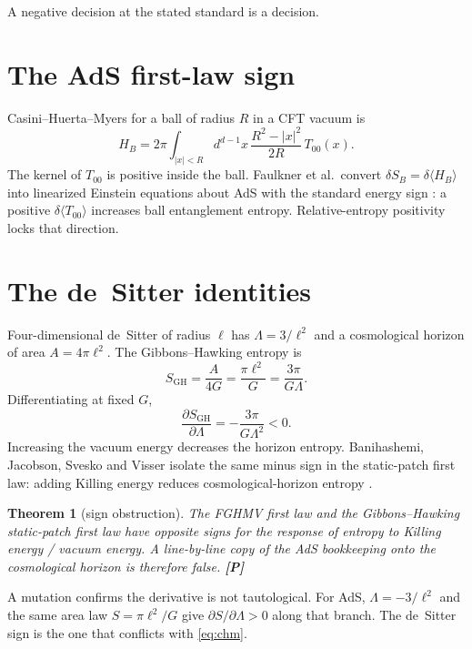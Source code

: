 \documentclass[11pt]{article}
\newtheorem{theorem}{Theorem}[section]
\theoremstyle{definition}
\newcommand{\pP}{\textbf{[P]}}
\begin{document}
A negative decision at the stated standard is a decision.

\section{The AdS first-law sign}

Casini--Huerta--Myers for a ball of radius $R$ in a CFT vacuum is
\cite{CHM2011}
\begin{equation}
H_B
=
2\pi\int_{\lvert x\rvert<R}\!d^{d-1}x\,
\frac{R^2-\lvert x\rvert^2}{2R}\,T_{00}(x).
\label{eq:chm}
\end{equation}
The kernel of $T_{00}$ is positive inside the ball. Faulkner et
al.\ convert $\delta S_B=\delta\langle H_B\rangle$ into linearized
Einstein equations about AdS with the standard energy sign
\cite{FGHMV2014}: a positive $\delta\langle T_{00}\rangle$
increases ball entanglement entropy. Relative-entropy positivity
locks that direction.

\section{The de~Sitter identities}

Four-dimensional de~Sitter of radius $\ell$ has
$\Lambda=3/\ell^2$ and a cosmological horizon of area
$A=4\pi\ell^2$. The Gibbons--Hawking entropy is
\cite{GibbonsHawking1977}
\begin{equation}
S_{\mathrm{GH}}
=
\frac{A}{4G}
=
\frac{\pi\ell^2}{G}
=
\frac{3\pi}{G\Lambda}.
\label{eq:gh}
\end{equation}
Differentiating at fixed $G$,
\begin{equation}
\frac{\partial S_{\mathrm{GH}}}{\partial\Lambda}
=
-\frac{3\pi}{G\Lambda^2}
<0.
\label{eq:dsign}
\end{equation}
Increasing the vacuum energy decreases the horizon entropy.
Banihashemi, Jacobson, Svesko and Visser isolate the same minus
sign in the static-patch first law: adding Killing energy reduces
cosmological-horizon entropy \cite{Banihashemi2023}.

\begin{theorem}[sign obstruction]
\label{thm:sign}
The FGHMV first law and the Gibbons--Hawking static-patch first law
have opposite signs for the response of entropy to Killing energy /
vacuum energy. A line-by-line copy of the AdS bookkeeping onto the
cosmological horizon is therefore false. \pP{}
\end{theorem}

A mutation confirms the derivative is not tautological. For AdS,
$\Lambda=-3/\ell^2$ and the same area law $S=\pi\ell^2/G$ give
$\partial S/\partial\Lambda>0$ along that branch. The de~Sitter
sign is the one that conflicts with \eqref{eq:chm}.
\end{document}
